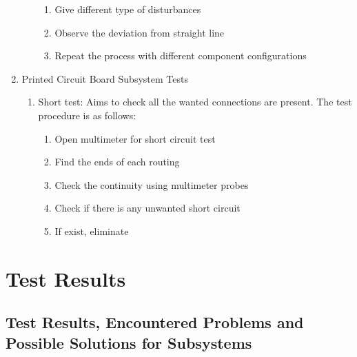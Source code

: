 \documentclass[a4paper,12pt]{article}
\begin{document}
\begin{enumerate}
\begin{enumerate}
\begin{enumerate}
\item Give different type of disturbances 

\item Observe the deviation from straight line

\item Repeat the process with different component configurations

\end{enumerate} 

\end{enumerate}








\item {Printed Circuit Board Subsystem Tests}


\begin{enumerate}

\item Short test: Aims to check all the wanted connections are present. The test procedure is as follows:

\begin{enumerate} 

\item Open multimeter for short circuit test  

\item Find the ends of each routing 

\item Check the continuity using multimeter probes

\item Check if there is any unwanted short circuit

\item If exist, eliminate

\end{enumerate}

\end{enumerate}




\end{enumerate}



\newpage
\section{Test Results}


\subsection{Test Results, Encountered Problems and Possible Solutions for Subsystems}	
\end{document}
